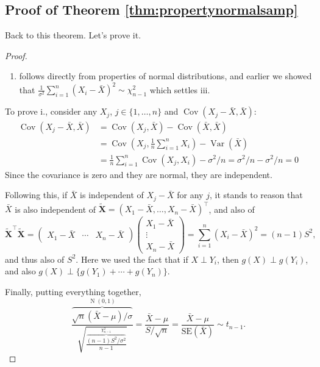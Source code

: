 \documentclass[
]{book}
\providecommand{\tightlist}{%
  \setlength{\itemsep}{0pt}\setlength{\parskip}{0pt}}
\newcommand{\bX}{{\boldsymbol X}}
\DeclareMathOperator{\Var}{Var}
\DeclareMathOperator{\Cov}{Cov}
\DeclareMathOperator{\N}{N}
\theoremstyle{definition}
\theoremstyle{definition}
\theoremstyle{definition}
\theoremstyle{definition}
\theoremstyle{remark}
\begin{document}
\hypertarget{proof-of-theorem-refthmpropertynormalsamp}{%
\subsection{Proof of Theorem \ref{thm:propertynormalsamp}}\label{proof-of-theorem-refthmpropertynormalsamp}}

Back to this theorem. Let's prove it.

\begin{proof}

\begin{enumerate}
\def\labelenumi{\roman{enumi}.}
\setcounter{enumi}{1}
\tightlist
\item
  follows directly from properties of normal distributions, and
  earlier we showed that \(\frac{1}{\sigma^2}\sum_{i=1}^n (X_i - \bar X)^2 \sim \chi^2_{n-1}\) which settles iii.
\end{enumerate}

To prove i., consider any \(X_j\), \(j\in\{1,\dots,n\}\) and
\(\Cov( X_j - \bar X, \bar X)\): \[\begin{aligned}
    \Cov( X_j - \bar X, \bar X)
    &= \Cov( X_j, \bar X) - \Cov(\bar X, \bar X) \\
    &= \Cov\left(X_j, \frac{1}{n}\sum_{i=1}^n X_i\right) - \Var(\bar X) \\
    &= \frac{1}{n} \sum_{i=1}^n \Cov(X_j,X_i) - \sigma^2/n = \sigma^2 /n - \sigma^2 /n = 0
  \end{aligned}\]
Since the covariance is zero and they are normal, they
are independent.

Following this, if \(\bar X\) is independent of \(X_j - \bar X\) for
any \(j\), it stands to reason that \(\bar X\) is also independent of
\(\tilde \bX = (X_1-\bar X,\dots,X_n-\bar X)^\top\), and also of
\[\tilde\bX^\top\tilde\bX = 
    \begin{pmatrix}
      X_1-\bar X &
      \cdots &
      X_n-\bar X
    \end{pmatrix}
    \begin{pmatrix}
      X_1-\bar X \\
      \vdots \\
      X_n-\bar X
    \end{pmatrix}
    = \sum_{i=1}^n (X_i - \bar X)^2 = (n-1)S^2,\] and thus also of
\(S^2\). Here we used the fact that if \(X \perp Y_i\), then \(g(X)\perp g(Y_i)\),
and also \(g(X) \perp \{g(Y_1) + \cdots + g(Y_n)\}\).

Finally, putting everything together,
\[\frac{\overbrace{\sqrt n(\bar X - \mu)/\sigma}^{\N(0,1)}}{\sqrt{\frac{\overbrace{(n-1)S^2/\sigma^2}^{\chi^2_{n-1}}}{n-1}}}
    = \frac{\bar X - \mu}{S/\sqrt{n}}
    = \frac{\bar X - \mu}{\text{SE}(\bar X)} \sim t_{n-1}.\]

\end{proof}
\end{document}
